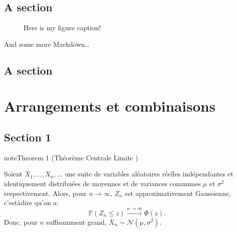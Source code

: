 \documentclass[letterpaper,10pt,english]{jupyterBook}
\let\sphinxpxdimen\pdfpxdimen\else\newdimen\sphinxpxdimen
\begin{document}
\section{A section}
\label{\detokenize{Probabilit_xe9/concepts_de_base:a-section}}
\begin{figure}[htbp]
\centering
\capstart

\noindent\sphinxincludegraphics[height=350\sphinxpxdimen]{{Probabilité/tikz}.#}
\caption{Here is my figure caption!}\label{\detokenize{Probabilit_xe9/concepts_de_base:directive-fig}}\end{figure}

\sphinxAtStartPar
And some more Markdown…


\section{A section}
\label{\detokenize{Probabilit_xe9/concepts_de_base:id1}}
\sphinxstepscope


\chapter{Arrangements et combinaisons}
\label{\detokenize{Probabilit_xe9/arrangements_et_combinaisons:arrangements-et-combinaisons}}\label{\detokenize{Probabilit_xe9/arrangements_et_combinaisons::doc}}

\section{Section 1}
\label{\detokenize{Probabilit_xe9/arrangements_et_combinaisons:section-1}}\label{Probabilité/arrangements_et_combinaisons:theorem-0}
\begin{sphinxadmonition}{note}{Theorem 1 (Théorème Centrale Limite )}



\sphinxAtStartPar
Soient \(X_1, \dots, X_n, \dots\) une suite de variables aléatoires réelles indépendantes et identiquement distribuées de moyennes et de variances communes \(\mu\) et \(\sigma^2\) respectivement. Alors, pour \(n \rightarrow \infty\), \(Z_n\) est approximativement Gaussienne, c’est\sphinxhyphen{}à\sphinxhyphen{}dire qu’on a:
\label{equation:Probabilité/arrangements_et_combinaisons:2a996ed5-f4cc-46fd-8896-11853fb30128}\begin{equation}
\mathbb{P}( Z_n \leq z ) \stackrel{n\rightarrow\infty}{\longrightarrow} \Phi(z).
\end{equation}
\sphinxAtStartPar
Donc, pour \(n\) suffisamment grand, \(\overline{X}_n \sim \mathcal{N}(\mu, \sigma^2)\).
\end{sphinxadmonition}
\end{document}
